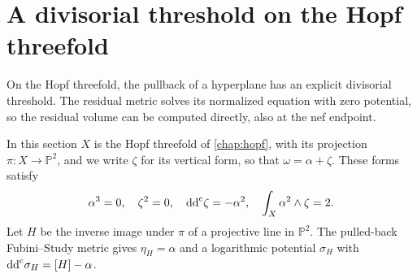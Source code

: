 

\section{A divisorial threshold on the Hopf threefold}
\label{sec:hopf-divisorial-volume}

On the Hopf threefold, the pullback of a hyperplane has an explicit divisorial threshold. The residual metric solves its normalized equation with zero potential, so the residual volume can be computed directly, also at the nef endpoint.

In this section $X$ is the Hopf threefold of \cref{chap:hopf}, with its projection $\pi\colon X\to\mathbb P^2$, and we write $\zeta$ for its vertical form, so that $\omega=\alpha+\zeta$. These forms satisfy
\[
 \alpha^3=0,\quad\zeta^2=0,\quad
 \mathrm{dd}^{\mathrm{c}}\zeta=-\alpha^2,\quad\int_X\alpha^2\wedge\zeta=2.
\]
Let $H$ be the inverse image under $\pi$ of a projective line in $\mathbb P^2$. The pulled-back Fubini--Study metric gives $\eta_H=\alpha$ and a logarithmic potential $\sigma_H$ with $\mathrm{dd}^{\mathrm{c}}\sigma_H=[H]-\alpha$.

